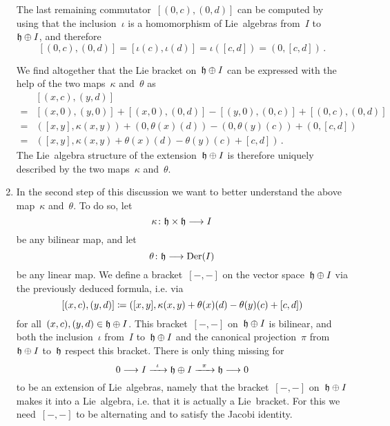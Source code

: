 \begin{fluff}
\begin{enumerate}
      The last remaining commutator~$[(0,c), (0,d)]$ can be computed by using that the inclusion~$\iota$ is a homomorphism of Lie~algebras from~$I$ to~$\mathfrak{h} \oplus I$, and therefore
      \[
        [(0,c), (0,d)]
        =
        [\iota(c), \iota(d)]
        =
        \iota([c,d])
        =
        (0, [c,d]) \,.
      \]

      We find altogether that the Lie bracket on~$\mathfrak{h} \oplus I$ can be expressed with the help of the two maps~$\kappa$ and~$\theta$ as
      \begin{align*}
        {}&
        [ (x,c), (y,d) ]
        \\
        ={}&
        [(x,0), (y,0)]
        + [(x,0), (0,d)]
        - [(y,0), (0,c)]
        + [(0,c), (0,d)]
        \\
        ={}&
          ( [x,y], \kappa(x,y) )
        + ( 0, \theta(x)(d) )
        - ( 0, \theta(y)(c) )
        + ( 0, [c,d] )
        \\
        ={}&
        (
          [x,y],
          \kappa(x,y) + \theta(x)(d) - \theta(y)(c) + [c,d]
        ) \,.
      \end{align*}
      The Lie~algebra structure of the extension~$\mathfrak{h} \oplus I$ is therefore uniquely described by the two maps~$\kappa$ and~$\theta$.
    \item
      In the second step of this discussion we want to better understand the above map~$\kappa$ and~$\theta$.
      To do so, let
      \[
        \kappa
        \colon
        \hlie \times \hlie
        \to
        I
      \]
      be any bilinear map, and let
      \[
        \theta
        \colon
        \hlie
        \to
        \Der(I)
      \]
      be any linear map.
      We define a bracket~$[-,-]$ on the vector space~$\mathfrak{h} \oplus I$ via the previously deduced formula, i.e. via
      \begin{equation}
        \label{definition of lie bracket depending on kappa and theta}
        [(x,c), (y,d)]
        \coloneqq
        (
          [x,y] ,
          \kappa(x,y) + \theta(x)(d) - \theta(y)(c) + [c,d]
        )
      \end{equation}
      for all~$(x,c), (y,d) \in \mathfrak{h} \oplus I$.
      This bracket~$[-,-]$ on~$\mathfrak{h} \oplus I$ is bilinear, and both the inclusion~$\iota$ from~$I$ to~$\mathfrak{h} \oplus I$ and the canonical projection~$\pi$ from~$\mathfrak{h} \oplus I$ to~$\mathfrak{h}$ respect this bracket.
      There is only thing missing for
      \[
        0
        \to
        I
        \xto{\iota}
        \hlie \oplus I
        \xto{\pi}
        \hlie
        \to
        0
      \]
      to be an extension of Lie~algebras, namely that the bracket~$[-,-]$ on~$\mathfrak{h} \oplus I$ makes it into a Lie~algebra, i.e. that it is actually a Lie~bracket.
      For this we need~$[-,-]$ to be alternating and to satisfy the Jacobi identity.


\end{enumerate}
\end{fluff}
